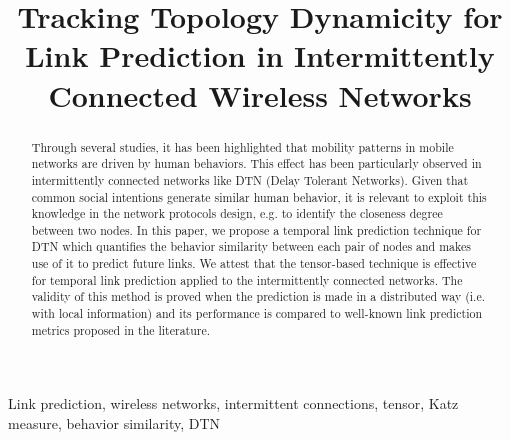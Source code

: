 \documentclass[conference]{IEEEtran}
\begin{document}
\title{Tracking Topology Dynamicity for Link Prediction in Intermittently Connected Wireless Networks}


\author{
 }






\IEEEoverridecommandlockouts
{}


\maketitle


\begin{abstract}
Through several studies, it has been highlighted that mobility
patterns in mobile networks are driven by human behaviors. This
effect has been particularly observed in intermittently connected
networks like DTN (Delay Tolerant Networks). Given that common
social intentions generate similar human behavior, it is relevant to
exploit this knowledge in the network protocols design, e.g. to
identify the closeness degree between two nodes. In this paper, we
propose a temporal link prediction technique for DTN which
quantifies the behavior similarity between each pair of nodes and
makes use of it to predict future links. We attest that the
tensor-based technique is effective for temporal link prediction
applied to the intermittently connected networks. The validity of
this method is proved when the prediction is made in a distributed
way (i.e. with local information) and its performance is compared to
well-known link prediction metrics proposed in the literature.
\end{abstract}

\begin{IEEEkeywords}Link prediction, wireless networks, intermittent
connections, tensor, Katz measure, behavior similarity, DTN
\end{IEEEkeywords}
\end{document}
